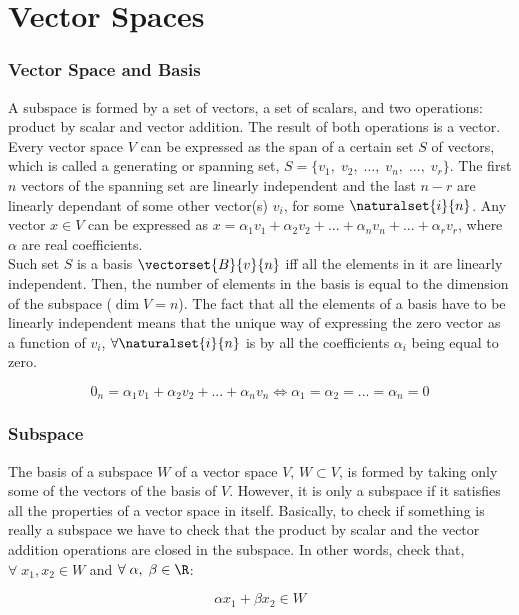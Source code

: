 \section*{Vector Spaces}

\subsubsection{Vector Space and Basis}

A subspace is formed by a set of vectors, a set of scalars, and two operations: product by scalar and vector addition. The result of both operations is a vector.\\

Every vector space $V$ can be expressed as the span of a certain set $S$ of vectors, which is called a generating or spanning set, $S=\{v_1,\;v_2,\;...,\;v_n,\;...,\;v_r\}$. The first $n$ vectors of the spanning set are linearly independent and the last $n-r$ are linearly dependant of some other vector(s) $v_i$, for some $\naturalset{i}{n}$. Any vector $x\in V$ can be expressed as $x=\alpha_1v_1+\alpha_2v_2+...+\alpha_nv_n+...+\alpha_rv_r$, where $\alpha$ are real coefficients.\\

Such set $S$ is a basis $\vectorset{B}{v}{n}$ iff all the elements in it are linearly independent. Then, the number of elements in the basis is equal to the dimension of the subspace ($\dim V=n$). The fact that all the elements of a basis have to be linearly independent means that the unique way of expressing the zero vector as a function of $v_i$, $\forall \naturalset{i}{n}$ is by all the coefficients $\alpha_i$ being equal to zero.

$$0_n=\alpha_1v_1+\alpha_2v_2+...+\alpha_nv_n\Leftrightarrow \alpha_1=\alpha_2=...=\alpha_n=0$$

\subsubsection{Subspace}

The basis of a subspace $W$ of a vector space $V$, $W\subset V$, is formed by taking only some of the vectors of the basis of $V$. However, it is only a subspace if it satisfies all the properties of a vector space in itself. Basically, to check if something is really a subspace we have to check that the product by scalar and the vector addition operations are closed in the subspace. In other words, check that, $\forall \; x_1, x_2 \in W$ and $\forall \; \alpha,\;\beta \in \R$:

$$\alpha x_1+\beta x_2 \in W$$